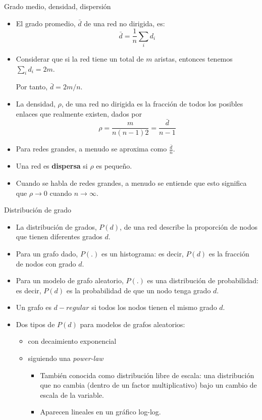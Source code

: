 \documentclass[11pt]{beamer}
\begin{document}
\begin{frame}{Grado medio, densidad, dispersión}
    \begin{itemize}
        \item El grado promedio, $\bar{d}$ de una red no dirigida, es:
        \begin{equation*}
            \bar{d}=\frac{1}{n}\sum_i d_i
        \end{equation*}
        
\item Considerar que si la red tiene un total de $m$ aristas, entonces tenemos
$\sum_i d_i= 2m$.

Por tanto, $\bar{d} = 2m/n$.
\item La densidad, $\rho$, de una red no dirigida es la fracción de todos los posibles enlaces que realmente existen, dados por
        \begin{equation*}
            \rho=\frac{m}{n(n-1)2}=\frac{\bar{d}}{n-1}
        \end{equation*}

\item Para redes grandes, a menudo se aproxima como $\frac{\bar{d}}{n}$.
\item Una red es \textbf{dispersa} si $\rho$ es pequeño.
\item Cuando se habla de redes grandes, a menudo se entiende que esto significa
que $\rho \longrightarrow 0$ cuando $n \longrightarrow \infty$.
    \end{itemize}
\end{frame}

\begin{frame}{Distribución de grado}
    \begin{itemize}
        \item La distribución de grados, $P (d)$, de una red describe la proporción de nodos que tienen diferentes grados $d$.
\item Para un grafo dado, $P (.)$ es un histograma: es decir, $P (d)$ es la fracción de nodos con grado $d$.
\item Para un modelo de grafo aleatorio, $P (.)$ es una distribución de probabilidad: es decir, $P (d)$ es la probabilidad de que un nodo tenga grado $d$.
\item Un grafo es $d-regular$ si todos los nodos tienen el mismo grado $d$.
\item Dos tipos de $P (d)$ para modelos de grafos aleatorios:
\begin{itemize}
    \item con decaimiento exponencial
    \item siguiendo una \textit{power-law}
    \begin{itemize}
        \item También conocida como distribución libre de escala: una distribución que no cambia (dentro de un factor multiplicativo) bajo un cambio de escala de la variable.
\item Aparecen lineales en un gráfico log-log.
    \end{itemize}
\end{itemize}
    \end{itemize}
\end{frame}
\end{document}
